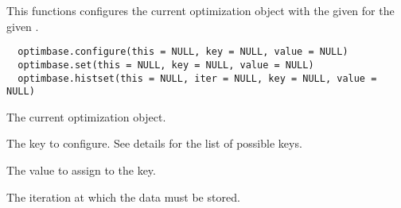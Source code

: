 %
\begin{Description}\relax
This functions configures the current optimization object with the given
 for the given .
\end{Description}
%
\begin{Usage}
\begin{verbatim}
  optimbase.configure(this = NULL, key = NULL, value = NULL)
  optimbase.set(this = NULL, key = NULL, value = NULL)
  optimbase.histset(this = NULL, iter = NULL, key = NULL, value = NULL)
\end{verbatim}
\end{Usage}
%
\begin{Arguments}
\begin{ldescription}
\item[\code{this}] The current optimization object.
\item[\code{key}] The key to configure. See details for the list of possible keys.
\item[\code{value}] The value to assign to the key.
\item[\code{iter}] The iteration at which the data must be stored.
\end{ldescription}
\end{Arguments}
%
